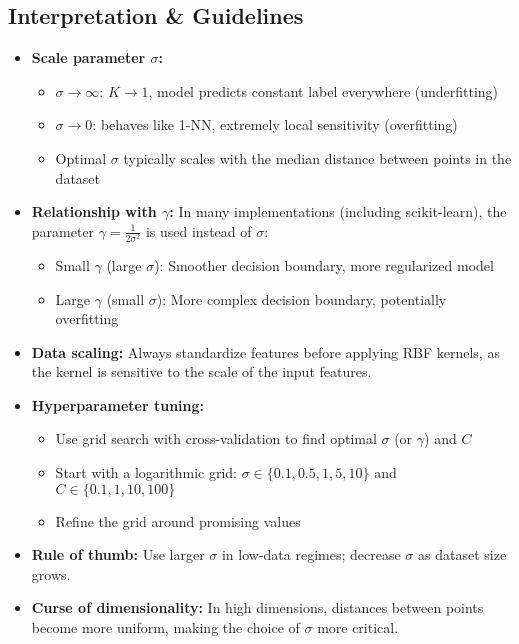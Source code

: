 \documentclass[11pt]{article}
\begin{document}
\subsection{Interpretation \& Guidelines}
\begin{itemize}
  \item \textbf{Scale parameter $\sigma$:}  
    \begin{itemize}
      \item $\sigma\to\infty$: $K\to1$, model predicts constant label everywhere (underfitting)
      \item $\sigma\to0$: behaves like 1-NN, extremely local sensitivity (overfitting)
      \item Optimal $\sigma$ typically scales with the median distance between points in the dataset
    \end{itemize}
  
  \item \textbf{Relationship with $\gamma$:} In many implementations (including scikit-learn), the parameter $\gamma = \frac{1}{2\sigma^2}$ is used instead of $\sigma$:
    \begin{itemize}
      \item Small $\gamma$ (large $\sigma$): Smoother decision boundary, more regularized model
      \item Large $\gamma$ (small $\sigma$): More complex decision boundary, potentially overfitting
    \end{itemize}
  
  \item \textbf{Data scaling:} Always standardize features before applying RBF kernels, as the kernel is sensitive to the scale of the input features.
  
  \item \textbf{Hyperparameter tuning:} 
    \begin{itemize}
      \item Use grid search with cross-validation to find optimal $\sigma$ (or $\gamma$) and $C$
      \item Start with a logarithmic grid: $\sigma \in \{0.1, 0.5, 1, 5, 10\}$ and $C \in \{0.1, 1, 10, 100\}$
      \item Refine the grid around promising values
    \end{itemize}
  
  \item \textbf{Rule of thumb:} Use larger $\sigma$ in low-data regimes; decrease $\sigma$ as dataset size grows.
  
  \item \textbf{Curse of dimensionality:} In high dimensions, distances between points become more uniform, making the choice of $\sigma$ more critical.
\end{itemize}
\end{document}
